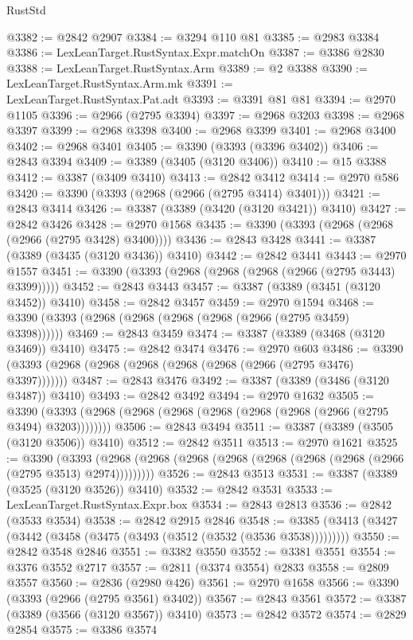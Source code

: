 \begin{lexlean}{RustStd}
\begin{coremodule}
@3382 := @2842 @2907
@3384 := @3294 @110 @81
@3385 := @2983 @3384
@3386 := LexLeanTarget.RustSyntax.Expr.matchOn
@3387 := @3386 @2830
@3388 := LexLeanTarget.RustSyntax.Arm
@3389 := @2 @3388
@3390 := LexLeanTarget.RustSyntax.Arm.mk
@3391 := LexLeanTarget.RustSyntax.Pat.adt
@3393 := @3391 @81 @81
@3394 := @2970 @1105
@3396 := @2966 (@2795 @3394)
@3397 := @2968 @3203
@3398 := @2968 @3397
@3399 := @2968 @3398
@3400 := @2968 @3399
@3401 := @2968 @3400
@3402 := @2968 @3401
@3405 := @3390 (@3393 (@3396 @3402))
@3406 := @2843 @3394
@3409 := @3389 (@3405 (@3120 @3406))
@3410 := @15 @3388
@3412 := @3387 (@3409 @3410)
@3413 := @2842 @3412
@3414 := @2970 @586
@3420 := @3390 (@3393 (@2968 (@2966 (@2795 @3414) @3401)))
@3421 := @2843 @3414
@3426 := @3387 (@3389 (@3420 (@3120 @3421)) @3410)
@3427 := @2842 @3426
@3428 := @2970 @1568
@3435 := @3390 (@3393 (@2968 (@2968 (@2966 (@2795 @3428) @3400))))
@3436 := @2843 @3428
@3441 := @3387 (@3389 (@3435 (@3120 @3436)) @3410)
@3442 := @2842 @3441
@3443 := @2970 @1557
@3451 := @3390 (@3393 (@2968 (@2968 (@2968 (@2966 (@2795 @3443) @3399)))))
@3452 := @2843 @3443
@3457 := @3387 (@3389 (@3451 (@3120 @3452)) @3410)
@3458 := @2842 @3457
@3459 := @2970 @1594
@3468 := @3390 (@3393 (@2968 (@2968 (@2968 (@2968 (@2966 (@2795 @3459) @3398))))))
@3469 := @2843 @3459
@3474 := @3387 (@3389 (@3468 (@3120 @3469)) @3410)
@3475 := @2842 @3474
@3476 := @2970 @603
@3486 := @3390 (@3393 (@2968 (@2968 (@2968 (@2968 (@2968 (@2966 (@2795 @3476) @3397)))))))
@3487 := @2843 @3476
@3492 := @3387 (@3389 (@3486 (@3120 @3487)) @3410)
@3493 := @2842 @3492
@3494 := @2970 @1632
@3505 := @3390 (@3393 (@2968 (@2968 (@2968 (@2968 (@2968 (@2968 (@2966 (@2795 @3494) @3203))))))))
@3506 := @2843 @3494
@3511 := @3387 (@3389 (@3505 (@3120 @3506)) @3410)
@3512 := @2842 @3511
@3513 := @2970 @1621
@3525 := @3390
    (@3393 (@2968 (@2968 (@2968 (@2968 (@2968 (@2968 (@2968 (@2966 (@2795 @3513) @2974)))))))))
@3526 := @2843 @3513
@3531 := @3387 (@3389 (@3525 (@3120 @3526)) @3410)
@3532 := @2842 @3531
@3533 := LexLeanTarget.RustSyntax.Expr.box
@3534 := @2843 @2813
@3536 := @2842 (@3533 @3534)
@3538 := @2842 @2915 @2846
@3548 := @3385 (@3413 (@3427 (@3442 (@3458 (@3475 (@3493 (@3512 (@3532 (@3536 @3538)))))))))
@3550 := @2842 @3548 @2846
@3551 := @3382 @3550
@3552 := @3381 @3551
@3554 := @3376 @3552 @2717
@3557 := @2811 (@3374 @3554) @2833
@3558 := @2809 @3557
@3560 := @2836 (@2980 @426)
@3561 := @2970 @1658
@3566 := @3390 (@3393 (@2966 (@2795 @3561) @3402))
@3567 := @2843 @3561
@3572 := @3387 (@3389 (@3566 (@3120 @3567)) @3410)
@3573 := @2842 @3572
@3574 := @2829 @2854
@3575 := @3386 @3574

\end{coremodule}
\end{lexlean}
